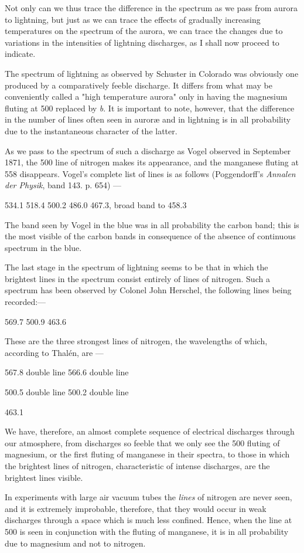 \documentclass[a4paper, 12pt, oneside, polutonikogreek, english]{article}
\begin{document}
Not only can we thus trace the difference in the spectrum as we pass from aurora to lightning, but just as we can trace the effects of gradually increasing temperatures on the spectrum of the aurora, we can trace the changes due to variations in the intensities of lightning discharges, as I shall now proceed to indicate.

The spectrum of lightning as observed by Schuster in Colorado was obviously one produced by a comparatively feeble discharge. It differs from what may be conveniently called a "high temperature aurora" only in having the magnesium fluting at 500 replaced by \emph{b}. It is important to note, however, that the difference in the number of lines often seen in auroræ and in lightning is in all probability due to the instantaneous character of the latter.

As we pass to the spectrum of such a discharge as Vogel observed in September 1871, the 500 line of nitrogen makes its appearance, and the manganese fluting at 558 disappears. Vogel's complete list of lines is as follows (Poggendorff's \emph{Annalen der Physik}, band 143. p. 654) ---

534.1 
518.4 
500.2 
486.0 
467.3, broad band 
to 458.3

The band seen by Vogel in the blue was in all probability the carbon band; this is the most visible of the carbon bands in consequence of the absence of continuous spectrum in the blue.

The last stage in the spectrum of lightning seems to be that in which the brightest lines in the spectrum consist entirely of lines of nitrogen. Such a spectrum has been observed by Colonel John Herschel, the following lines being recorded:---

569.7 
500.9 
463.6 

These are the three strongest lines of nitrogen, the wavelengths of which, according to Thalén, are ---

567.8 double line 
566.6 double line 

500.5 double line 
500.2 double line 

463.1 

We have, therefore, an almost complete sequence of electrical discharges through our atmosphere, from discharges so feeble that we only see the 500 fluting of magnesium, or the first fluting of manganese in their spectra, to those in which the brightest lines of nitrogen, characteristic of intense discharges, are the brightest lines visible.

In experiments with large air vacuum tubes the \emph{lines} of nitrogen are never seen, and it is extremely improbable, therefore, that they would occur in weak discharges through a space which is much less confined. Hence, when the line at 500 is seen in conjunction with the fluting of manganese, it is in all probability due to magnesium and not to nitrogen.
\end{document}
